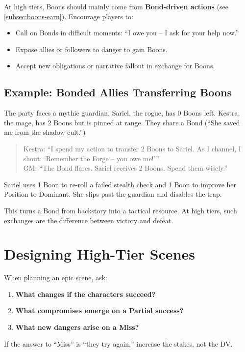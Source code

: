 At high tiers, Boons should mainly come from \textbf{Bond-driven actions} (see \ref{subsec:boons-earn}). Encourage players to:
\begin{itemize}
  \item Call on Bonds in difficult moments: ``I owe you -- I ask for your help now.''
  \item Expose allies or followers to danger to gain Boons.
  \item Accept new obligations or narrative fallout in exchange for Boons.
\end{itemize}

\subsection*{Example: Bonded Allies Transferring Boons}
The party faces a mythic guardian. Sariel, the rogue, has 0 Boons left. Kestra, the mage, has 2 Boons but is pinned at range. They share a Bond (``She saved me from the shadow cult.'')

\begin{quote}
  Kestra: ``I spend my action to transfer 2 Boons to Sariel. As I channel, I shout: `Remember the Forge -- you owe me!'''\\
  GM: ``The Bond flares. Sariel receives 2 Boons. Spend them wisely.''
\end{quote}
Sariel uses 1 Boon to re-roll a failed stealth check and 1 Boon to improve her Position to Dominant. She slips past the guardian and disables the trap.

This turns a Bond from backstory into a tactical resource. At high tiers, such exchanges are the difference between victory and defeat.

\section{Designing High-Tier Scenes}

When planning an epic scene, ask:
\begin{enumerate}
  \item \textbf{What changes if the characters succeed?}
  \item \textbf{What compromises emerge on a Partial success?}
  \item \textbf{What new dangers arise on a Miss?}
\end{enumerate}

If the answer to ``Miss'' is ``they try again,'' increase the stakes, not the DV.


